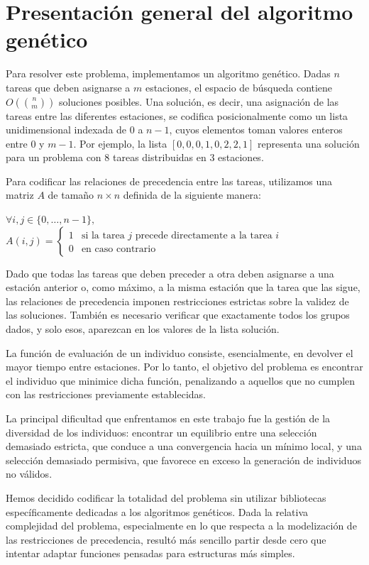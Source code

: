 \documentclass[12pt,a4paper]{report}
\begin{document}
    \section{Presentación general del algoritmo genético}

    Para resolver este problema, implementamos un algoritmo genético. 
    Dadas $n$ tareas que deben asignarse a $m$ estaciones, el espacio de búsqueda contiene $O\left(\binom{n}{m}\right)$ soluciones posibles. 
    Una solución, es decir, una asignación de las tareas entre las diferentes estaciones, se codifica posicionalmente como un lista unidimensional indexada de $0$ a $n-1$, 
    cuyos elementos toman valores enteros entre $0$ y $m-1$. Por ejemplo, la lista $[0, 0, 0, 1, 0, 2, 2, 1]$ representa una solución para un problema con $8$ tareas distribuidas en $3$ estaciones.

    Para codificar las relaciones de precedencia entre las tareas, utilizamos una matriz $A$ de tamaño $n \times n$ definida de la siguiente manera:

    $
    \forall i,j \in \{0,\dots,n-1\},$
    $
    A(i,j) = 
    \begin{cases}
    1 & \text{si la tarea } j \text{ precede directamente a la tarea } i \\
    0 & \text{en caso contrario}
    \end{cases}
    $


    Dado que todas las tareas que deben preceder a otra deben asignarse a una estación anterior o, como máximo, a la misma estación que la tarea que las sigue, 
    las relaciones de precedencia imponen restricciones estrictas sobre la validez de las soluciones. También es necesario verificar que exactamente todos los grupos dados, y solo esos, aparezcan en los valores de la lista solución.

    La función de evaluación de un individuo consiste, esencialmente, en devolver el mayor tiempo entre estaciones. Por lo tanto, el objetivo del problema es encontrar el individuo que minimice dicha función, penalizando a aquellos que no cumplen con las restricciones previamente establecidas.

    La principal dificultad que enfrentamos en este trabajo fue la gestión de la diversidad de los individuos: encontrar un equilibrio entre una selección demasiado estricta, que conduce a una convergencia hacia un mínimo local, y una selección demasiado permisiva, que favorece en exceso la generación de individuos no válidos.

    Hemos decidido codificar la totalidad del problema sin utilizar bibliotecas específicamente dedicadas a los algoritmos genéticos. Dada la relativa complejidad del problema, especialmente en lo que respecta a la modelización de las restricciones de precedencia, resultó más sencillo partir desde cero que intentar adaptar funciones pensadas para estructuras más simples.
\end{document}
